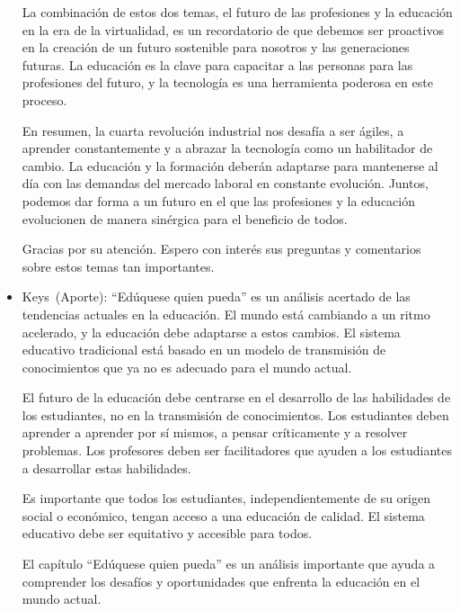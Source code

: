 \documentclass[letterpaper, 12pt]{article}
\newcommand{\memberKeys}{Keys~}
\begin{document}
\begin{itemize}[label=$\triangleright$]
          La combinación de estos dos temas, el futuro de las
          profesiones y la educación en la era de la virtualidad, es
          un recordatorio de que debemos ser proactivos en la
          creación de un futuro sostenible para nosotros y las
          generaciones futuras. La educación es la clave para
          capacitar a las personas para las profesiones del futuro, y
          la tecnología es una herramienta poderosa en este proceso.

          En resumen, la cuarta revolución industrial nos desafía a
          ser ágiles, a aprender constantemente y a abrazar la
          tecnología como un habilitador de cambio. La educación y la
          formación deberán adaptarse para mantenerse al día con las
          demandas del mercado laboral en constante evolución.
          Juntos, podemos dar forma a un futuro en el que las
          profesiones y la educación evolucionen de manera sinérgica
          para el beneficio de todos.

          Gracias por su atención. Espero con interés sus preguntas y
          comentarios sobre estos temas tan importantes.

    \item \memberKeys (Aporte):
          ``Edúquese quien pueda'' es un análisis acertado de las tendencias actuales en la educación. El mundo está cambiando a un ritmo acelerado, y la educación debe adaptarse a estos cambios. El sistema educativo tradicional está basado en un modelo de transmisión de conocimientos que ya no es adecuado para el mundo actual.

          El futuro de la educación debe centrarse en el desarrollo
          de las habilidades de los estudiantes, no en la transmisión
          de conocimientos. Los estudiantes deben aprender a aprender
          por sí mismos, a pensar críticamente y a resolver
          problemas. Los profesores deben ser facilitadores que
          ayuden a los estudiantes a desarrollar estas habilidades.

          Es importante que todos los estudiantes, independientemente
          de su origen social o económico, tengan acceso a una
          educación de calidad. El sistema educativo debe ser
          equitativo y accesible para todos.

          El capítulo ``Edúquese quien pueda'' es un análisis
          importante que ayuda a comprender los desafíos y
          oportunidades que enfrenta la educación en el mundo actual.


\end{itemize}
\end{document}
